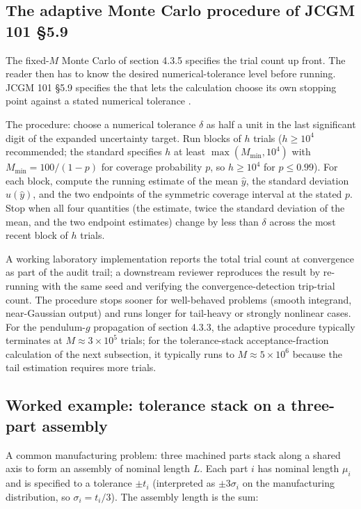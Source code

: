 \subsection{The adaptive Monte Carlo procedure of JCGM 101 \S 5.9}

The fixed-$M$ Monte Carlo of section 4.3.5 specifies the trial
count up front. The reader then has to know the desired
numerical-tolerance level before running. JCGM 101 \S 5.9 specifies
the  that lets the
calculation choose its own stopping point against a stated
numerical tolerance \cite{std:ch04t3-jcgm-101-sec59}.

The procedure: choose a numerical tolerance $\delta$ as half a unit
in the last significant digit of the expanded uncertainty target.
Run blocks of $h$ trials ($h \geq 10^{4}$ recommended; the standard
specifies $h$ at least $\max(M_{\min}, 10^{4})$ with $M_{\min} =
100/(1 - p)$ for coverage probability $p$, so $h \geq 10^{4}$ for
$p \leq 0.99$). For each block, compute the running estimate of the
mean $\hat{y}$, the standard deviation $\hat{u}(\hat{y})$, and the
two endpoints of the symmetric coverage interval at the stated $p$.
Stop when all four quantities (the estimate, twice the standard
deviation of the mean, and the two endpoint estimates) change by
less than $\delta$ across the most recent block of $h$ trials.

A working laboratory implementation reports the total trial count
at convergence as part of the audit trail; a downstream reviewer
reproduces the result by re-running with the same seed and verifying
the convergence-detection trip-trial count. The procedure stops
sooner for well-behaved problems (smooth integrand, near-Gaussian
output) and runs longer for tail-heavy or strongly nonlinear cases.
For the pendulum-$g$ propagation of section 4.3.3, the adaptive
procedure typically terminates at $M \approx 3 \times 10^{5}$
trials; for the tolerance-stack acceptance-fraction calculation of
the next subsection, it typically runs to $M \approx 5 \times 10^{6}$
because the tail estimation requires more trials.

\subsection{Worked example: tolerance stack on a three-part assembly}

A common manufacturing problem: three machined parts stack along a
shared axis to form an assembly of nominal length $L$. Each part
$i$ has nominal length $\mu_{i}$ and is specified to a tolerance
$\pm t_{i}$ (interpreted as $\pm 3\sigma_{i}$ on the manufacturing
distribution, so $\sigma_{i} = t_{i}/3$). The assembly length is
the sum:

